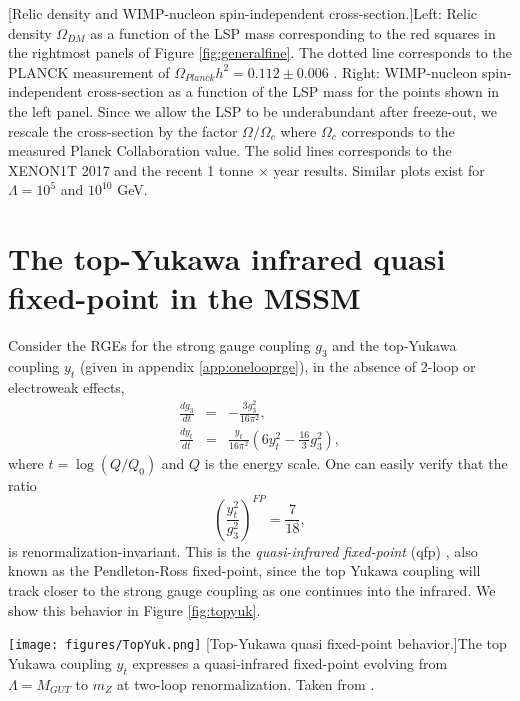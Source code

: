 \begin{center}
	[Relic density and WIMP-nucleon spin-independent cross-section.]{Left: Relic density $\Omega_{DM}$ as a function of the LSP mass corresponding to the red squares in the rightmost panels of Figure \ref{fig:generalfine}. The dotted line corresponds to the PLANCK measurement of $\Omega_{Planck}h^2 = 0.112 \pm 0.006$ \cite{RN498}. Right: WIMP-nucleon spin-independent cross-section as a function of the LSP mass for the points shown in the left panel. Since we allow the LSP to be underabundant after freeze-out, we rescale the cross-section by the factor $\Omega/\Omega_{c}$ where $\Omega_{c}$ corresponds to the measured Planck Collaboration value. The solid lines corresponds to the XENON1T 2017 \cite{RN606} and the recent 1 tonne $\times$ year \cite{RN770} results. Similar plots exist for $\Lambda=10^{5}$ and $10^{10}$ GeV.}
	\label{fig:DMfine}
\end{center}

\section{The top-Yukawa infrared quasi fixed-point in the MSSM}
\label{sec:topqfp}

Consider the RGEs for the strong gauge coupling $g_3$ and the top-Yukawa coupling $y_t$ (given in appendix \ref{app:onelooprge}), in the absence of 2-loop or electroweak effects,
\begin{eqnarray}
\frac{dg_3}{dt}&=&-\frac{3g^2_3}{16\pi^2}, \\
\frac{dy_t}{dt}&=&\frac{y_t}{16\pi^2}\left( 6y^2_t - \frac{16}{3}g^2_3 \right),
\end{eqnarray}
where $t=\log (Q/Q_0)$ and $Q$ is the energy scale. One can easily verify that the ratio
\begin{equation}
\left(\frac{y^2_t}{g^2_3}\right)^{FP}=\frac{7}{18},
\end{equation}
is renormalization-invariant. This is the \textit{quasi-infrared fixed-point} (\acrshort{qfp}) \cite{RN747,RN748}, also known as the Pendleton-Ross fixed-point, since the top Yukawa coupling will track closer to the strong gauge coupling as one continues into the infrared. We show this behavior in Figure \ref{fig:topyuk}.

\begin{center}
\texttt{[image: figures/TopYuk.png]}
[Top-Yukawa quasi fixed-point behavior.]{The top Yukawa coupling $y_t$ expresses a quasi-infrared fixed-point evolving from $\Lambda=M_{GUT}$ to $m_Z$ at two-loop renormalization. Taken from \cite{RN746}.}
\label{fig:topyuk}
\end{center}

